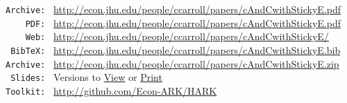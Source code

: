 \documentclass[titlepage]{\econtex}\newcommand{\texname}{cAndCwithStickyE}
\begin{document}
\parbox{\textwidth}{
  \begin{center}
\begin{tabbing}
\texttt{Archive:~} \= \= \url{http://econ.jhu.edu/people/ccarroll/papers/cAndCwithStickyE.pdf} \kill \\  %
\texttt{~~~~PDF:~} \> \> \url{http://econ.jhu.edu/people/ccarroll/papers/cAndCwithStickyE.pdf} \\
\texttt{~~~~Web:~} \> \> \url{http://econ.jhu.edu/people/ccarroll/papers/cAndCwithStickyE/} \\
\texttt{~BibTeX:~} \> \> \url{http://econ.jhu.edu/people/ccarroll/papers/cAndCwithStickyE.bib} \\
\texttt{Archive:~} \> \> \url{http://econ.jhu.edu/people/ccarroll/papers/cAndCwithStickyE.zip} \\
\texttt{~Slides:~} \> \> Versions to \href{http://econ.jhu.edu/people/ccarroll/papers/cAndCwithStickyE-Slides.pdf}{View} or \href{http://econ.jhu.edu/people/ccarroll/papers/cAndCwithStickyE-Slides-Print.pdf}{Print} \\
\texttt{Toolkit:~} \> \> \url{http://github.com/Econ-ARK/HARK} \\
\end{tabbing}
\end{center}
}
\end{document}
